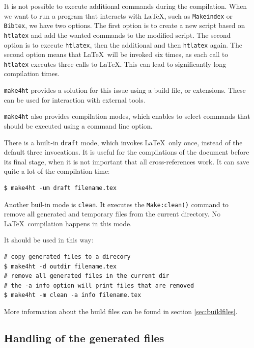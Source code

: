 It is not possible to execute additional commands during the
compilation. When we want to run a program that interacts with \LaTeX,
such as \texttt{Makeindex} or \texttt{Bibtex}, we have two options. The
first option is to create a new script based on \texttt{htlatex} and add
the wanted commands to the modified script. The second option is to
execute \texttt{htlatex}, then the additional and then \texttt{htlatex}
again. The second option means that \LaTeX~will be invoked six times, as
each call to \texttt{htlatex} executes three calls to \LaTeX. This can
lead to significantly long compilation times.

\texttt{make4ht} provides a solution for this issue using a build file,
or extensions. These can be used for interaction with external tools.

\texttt{make4ht} also provides compilation modes, which enables to
select commands that should be executed using a command line option.

There is a built-in \texttt{draft} mode, which invokes \LaTeX~only once,
instead of the default three invocations. It is useful for the
compilations of the document before its final stage, when it is not
important that all cross-references work. It can save quite a lot of the
compilation time:

\begin{verbatim}
$ make4ht -um draft filename.tex
\end{verbatim}

Another buil-in mode is \texttt{clean}. It executes the
\texttt{Make:clean()} command to remove all generated and temporary
files from the current directory. No \LaTeX~compilation happens in this
mode.

It should be used in this way:

\begin{verbatim}
# copy generated files to a direcory
$ make4ht -d outdir filename.tex 
# remove all generated files in the current dir
# the -a info option will print files that are removed
$ make4ht -m clean -a info filename.tex
\end{verbatim}

More information about the build files can be found in section
\ref{sec:buildfiles}.

\subsection{Handling of the generated
files}\label{handling-of-the-generated-files}


